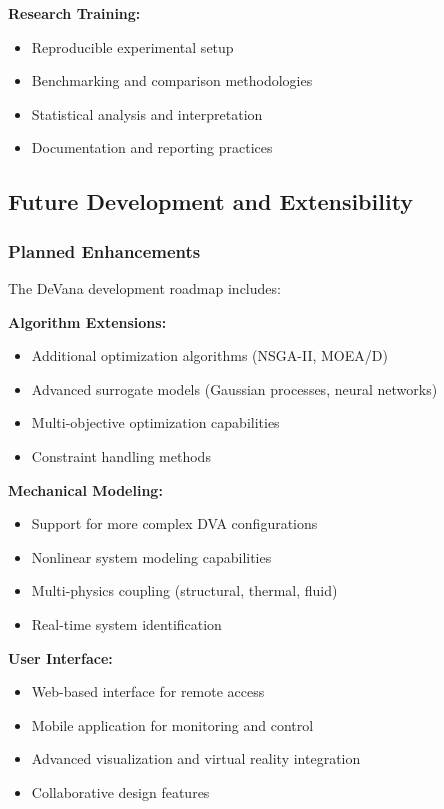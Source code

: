 \documentclass[12pt,a4paper]{article}
\newcommand{\softwareName}{DeVana}
\begin{document}
\textbf{Research Training:}
\begin{itemize}
    \item Reproducible experimental setup
    \item Benchmarking and comparison methodologies
    \item Statistical analysis and interpretation
    \item Documentation and reporting practices
\end{itemize}

\subsection{Future Development and Extensibility}

\subsubsection{Planned Enhancements}

The \softwareName{} development roadmap includes:

\textbf{Algorithm Extensions:}
\begin{itemize}
    \item Additional optimization algorithms (NSGA-II, MOEA/D)
    \item Advanced surrogate models (Gaussian processes, neural networks)
    \item Multi-objective optimization capabilities
    \item Constraint handling methods
\end{itemize}

\textbf{Mechanical Modeling:}
\begin{itemize}
    \item Support for more complex DVA configurations
    \item Nonlinear system modeling capabilities
    \item Multi-physics coupling (structural, thermal, fluid)
    \item Real-time system identification
\end{itemize}

\textbf{User Interface:}
\begin{itemize}
    \item Web-based interface for remote access
    \item Mobile application for monitoring and control
    \item Advanced visualization and virtual reality integration
    \item Collaborative design features
\end{itemize}
\end{document}
